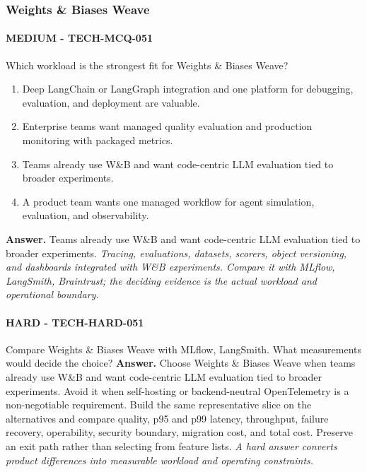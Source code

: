\subsubsection*{Weights \& Biases Weave}
\paragraph{MEDIUM - TECH-MCQ-051} Which workload is the strongest fit for Weights \& Biases Weave?
\begin{enumerate}[label=\Alph*.]
\item Deep LangChain or LangGraph integration and one platform for debugging, evaluation, and deployment are valuable.
\item Enterprise teams want managed quality evaluation and production monitoring with packaged metrics.
\item Teams already use W\&B and want code-centric LLM evaluation tied to broader experiments.
\item A product team wants one managed workflow for agent simulation, evaluation, and observability.
\end{enumerate}
\textbf{Answer.} Teams already use W\&B and want code-centric LLM evaluation tied to broader experiments.
\textit{Tracing, evaluations, datasets, scorers, object versioning, and dashboards integrated with W\&B experiments. Compare it with MLflow, LangSmith, Braintrust; the deciding evidence is the actual workload and operational boundary.}
\paragraph{HARD - TECH-HARD-051} Compare Weights \& Biases Weave with MLflow, LangSmith. What measurements would decide the choice?
\textbf{Answer.} Choose Weights \& Biases Weave when teams already use W\&B and want code-centric LLM evaluation tied to broader experiments. Avoid it when self-hosting or backend-neutral OpenTelemetry is a non-negotiable requirement. Build the same representative slice on the alternatives and compare quality, p95 and p99 latency, throughput, failure recovery, operability, security boundary, migration cost, and total cost. Preserve an exit path rather than selecting from feature lists.
\textit{A hard answer converts product differences into measurable workload and operating constraints.}

